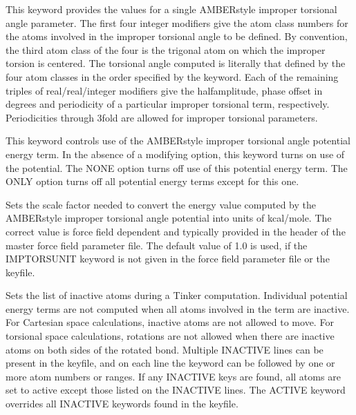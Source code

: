 \documentclass[letterpaper,11pt,english]{sphinxmanual}
\begin{document}
  This keyword provides the values for a single AMBER\sphinxhyphen{}style improper torsional angle parameter. The first four integer modifiers give the atom class numbers for the atoms involved in the improper torsional angle to be defined. By convention, the third atom class of the four is the trigonal atom on which the improper torsion is centered. The torsional angle computed is literally that defined by the four atom classes in the order specified by the keyword. Each of the remaining triples of real/real/integer modifiers give the half\sphinxhyphen{}amplitude, phase offset in degrees and periodicity of a particular improper torsional term, respectively. Periodicities through 3\sphinxhyphen{}fold are allowed for improper torsional parameters.

  This keyword controls use of the AMBER\sphinxhyphen{}style improper torsional angle potential energy term. In the absence of a modifying option, this keyword turns on use of the potential. The NONE option turns off use of this potential energy term. The ONLY option turns off all potential energy terms except for this one.

  Sets the scale factor needed to convert the energy value computed by the AMBER\sphinxhyphen{}style improper torsional angle potential into units of kcal/mole. The correct value is force field dependent and typically provided in the header of the master force field parameter file. The default value of 1.0 is used, if the IMPTORSUNIT keyword is not given in the force field parameter file or the keyfile.

  Sets the list of inactive atoms during a Tinker computation. Individual potential energy terms are not computed when all atoms involved in the term are inactive. For Cartesian space calculations, inactive atoms are not allowed to move. For torsional space calculations, rotations are not allowed when there are inactive atoms on both sides of the rotated bond. Multiple INACTIVE lines can be present in the keyfile, and on each line the keyword can be followed by one or more atom numbers or ranges. If any INACTIVE keys are found, all atoms are set to active except those listed on the INACTIVE lines. The ACTIVE keyword overrides all INACTIVE keywords found in the keyfile.

\end{document}
